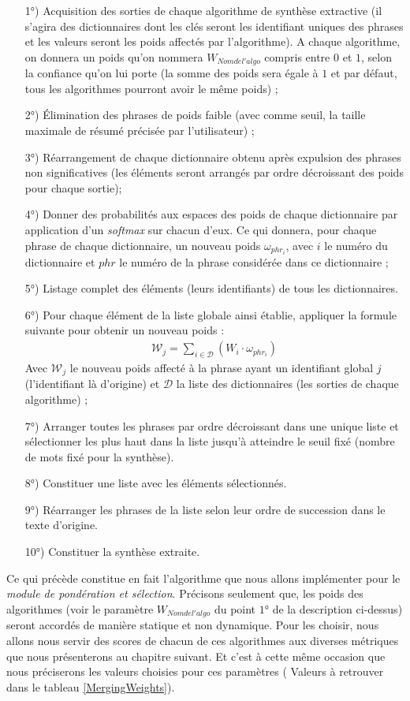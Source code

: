 \begin{itemize}
\item[1°)] Acquisition des sorties de chaque algorithme de synthèse extractive (il s'agira des dictionnaires dont les clés seront les identifiant uniques des phrases et les valeurs seront les poids affectés par l'algorithme). A chaque algorithme, on donnera un poids qu'on nommera $ W_{Nom de l'algo} $ compris entre $ 0 $ et $ 1 $, selon la confiance qu'on lui porte (la somme des poids sera égale à $ 1 $ et par défaut, tous les algorithmes pourront avoir le même poids) ;
\item[2°)] Élimination des phrases de poids faible (avec comme seuil, la taille maximale de résumé précisée par l'utilisateur) ;
\item[3°)] Réarrangement de chaque dictionnaire obtenu après expulsion des phrases non si\-gni\-fi\-ca\-ti\-ves (les éléments seront arrangés par ordre décroissant des poids pour chaque sortie);
\item[4°)] Donner des probabilités aux espaces des poids de chaque dictionnaire par application d'un \textit{softmax} sur chacun d'eux. Ce qui donnera, pour chaque phrase de chaque dictionnaire, un nouveau poids $ \omega_{phr_{i}} $, avec $ i $ le numéro du dictionnaire et $ phr $ le numéro de la phrase considérée dans ce dictionnaire ;
\item[5°)] Listage complet des éléments (leurs identifiants) de tous les dictionnaires.
\item[6°)] Pour chaque élément de la liste globale ainsi établie, appliquer la formule suivante pour obtenir un nouveau poids :
\begin{eqnarray}
\mathcal{W}_{j} = \sum_{i\in \mathcal{D}}\left( W_{i}\cdot \omega_{phr_{i}}\right)
\end{eqnarray}
Avec $ \mathcal{W}_{j} $ le nouveau poids affecté à la phrase ayant un identifiant global $ j $ (l'identifiant là d'origine) et $ \mathcal{D} $ la liste des dictionnaires (les sorties de chaque algorithme) ;
\item[7°)] Arranger toutes les phrases par ordre décroissant dans une unique liste et sélectionner les plus haut dans la liste jusqu'à atteindre le seuil fixé (nombre de mots fixé pour la synthèse).
\item[8°)] Constituer une liste avec les éléments sélectionnés.
\item[9°)] Réarranger les phrases de la liste selon leur ordre de succession dans le texte d'origine.
\item[10°)] Constituer la synthèse extraite.
\end{itemize}
Ce qui précède constitue en fait l'algorithme que nous allons implémenter pour le \textit{module de pondération et sélection}. Précisons seu\-le\-ment que, les poids des algorithmes (voir le paramètre $ W_{Nom de l'algo} $ du point $ 1° $ de la description ci-dessus) seront accordés de manière statique et non dynamique. Pour les choisir, nous allons nous servir des scores de chacun de ces algorithmes aux diverses métriques que nous présenterons au chapitre suivant. Et c'est à cette même occasion que nous préciserons les valeurs choisies pour ces paramètres ( Valeurs à retrouver dans le tableau \ref{MergingWeights}).
